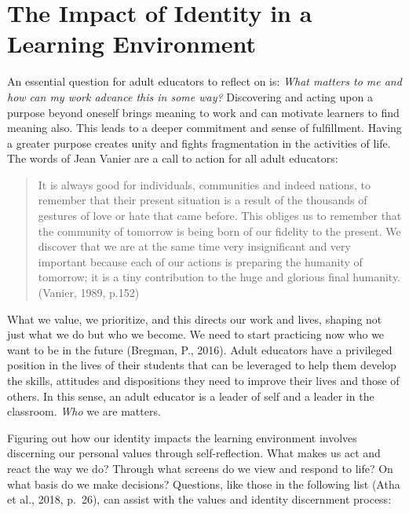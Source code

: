 \documentclass[
]{book}
\begin{document}
\hypertarget{the-impact-of-identity-in-a-learning-environment}{%
\section{The Impact of Identity in a Learning Environment}\label{the-impact-of-identity-in-a-learning-environment}}

An essential question for adult educators to reflect on is: \emph{What matters to me and how can my work advance this in some way?} Discovering and acting upon a purpose beyond oneself brings meaning to work and can motivate learners to find meaning also. This leads to a deeper commitment and sense of fulfillment. Having a greater purpose creates unity and fights fragmentation in the activities of life. The words of Jean Vanier are a call to action for all adult educators:

\begin{quote}
It is always good for individuals, communities and indeed nations, to remember that their present situation is a result of the thousands of gestures of love or hate that came before. This obliges us to remember that the community of tomorrow is being born of our fidelity to the present. We discover that we are at the same time very insignificant and very important because each of our actions is preparing the humanity of tomorrow; it is a tiny contribution to the huge and glorious final humanity. (Vanier, 1989, p.152)
\end{quote}

What we value, we prioritize, and this directs our work and lives, shaping not just what we do but who we become. We need to start practicing now who we want to be in the future (Bregman, P., 2016).
Adult educators have a privileged position in the lives of their students that can be leveraged to help them develop the skills, attitudes and dispositions they need to improve their lives and those of others. In this sense, an adult educator is a leader of self and a leader in the classroom. \emph{Who} we are matters.

Figuring out how our identity impacts the learning environment involves discerning our personal values through self-reflection. What makes us act and react the way we do? Through what screens do we view and respond to life? On what basis do we make decisions? Questions, like those in the following list (Atha et al., 2018, p.~26), can assist with the values and identity discernment process:
\end{document}
